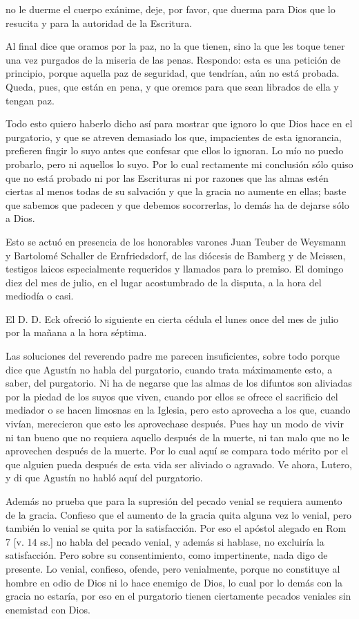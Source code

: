 no le duerme el cuerpo exánime, deje, por favor, que duerma para Dios que lo resucita y para la autoridad de la Escritura.

Al final dice que oramos por la paz, no la que tienen, sino la que les toque tener una vez purgados de la miseria de las penas. Respondo: esta es una petición de principio, porque aquella paz de seguridad, que tendrían, aún no está probada. Queda, pues, que están en pena, y que oremos para que sean librados de ella y tengan paz.

Todo esto quiero haberlo dicho así para mostrar que ignoro lo que Dios hace en el purgatorio, y que se atreven demasiado los que, impacientes de esta ignorancia, prefieren fingir lo suyo antes que confesar que ellos lo ignoran. Lo mío no puedo probarlo, pero ni aquellos lo suyo. Por lo cual rectamente mi conclusión sólo quiso que no está probado ni por las Escrituras ni por razones que las almas estén ciertas al menos todas de su salvación y que la gracia no aumente en ellas; baste que sabemos que padecen y que debemos socorrerlas, lo demás ha de dejarse sólo a Dios.

Esto se actuó en presencia de los honorables varones Juan Teuber de Weysmann y Bartolomé Schaller de Ernfriedsdorf, de las diócesis de Bamberg y de Meissen, testigos laicos especialmente requeridos y llamados para lo premiso. El domingo diez del mes de julio, en el lugar acostumbrado de la disputa, a la hora del mediodía o casi.

El D. D. Eck ofreció lo siguiente en cierta cédula el lunes once del mes de julio por la mañana a la hora séptima.

Las soluciones del reverendo padre me parecen insuficientes, sobre todo porque dice que Agustín no habla del purgatorio, cuando trata máximamente esto, a saber, \marginpar{\small[343]} del purgatorio. Ni ha de negarse que las almas de los difuntos son aliviadas por la piedad de los suyos que viven, cuando por ellos se ofrece el sacrificio del mediador o se hacen limosnas en la Iglesia, pero esto aprovecha a los que, cuando vivían, merecieron que esto les aprovechase después. Pues hay un modo de vivir ni tan bueno que no requiera aquello después de la muerte, ni tan malo que no le aprovechen después de la muerte. Por lo cual aquí se compara todo mérito por el que alguien pueda después de esta vida ser aliviado o agravado. Ve ahora, Lutero, y di que Agustín no habló aquí del purgatorio.

Además no prueba que para la supresión del pecado venial se requiera aumento de la gracia. Confieso que el aumento de la gracia quita alguna vez lo venial, pero también lo venial se quita por la satisfacción. Por eso el apóstol alegado en Rom 7 [v. 14 ss.] no habla del pecado venial, y además si hablase, no excluiría la satisfacción. Pero sobre su consentimiento, como impertinente, nada digo de presente. Lo venial, confieso, ofende, pero venialmente, porque no constituye al hombre en odio de Dios ni lo hace enemigo de Dios, lo cual por lo demás con la gracia no estaría, por eso en el purgatorio tienen ciertamente pecados veniales sin enemistad con Dios.

